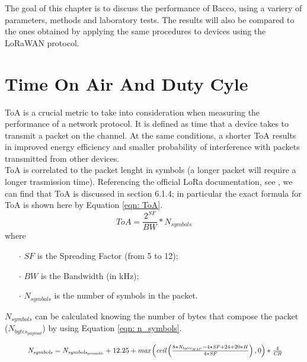 The goal of this chapter is to discuss the performance of Bacco, using a variery of parameters, methods and laboratory
tests. The results will also be compared to the ones obtained by applying the same procedures to devices using the
LoRaWAN protocol.

\section{Time On Air And Duty Cyle}
\Gls{ToA} is a crucial metric to take into consideration when measuring the performance of a network protocol. It is
defined as time that a device takes to transmit a packet on the channel. At the same conditions, a shorter \gls{ToA}
results in improved energy efficiency and smaller probability of interference with packets transmitted from other
devices.\\
\Gls{ToA} is correlated to the packet lenght in symbols (a longer packet will require a longer trasmission time).
Referencing the official LoRa documentation, see \cite{sx1262}, we can find that \gls{ToA} is
discussed in section 6.1.4; in particular the exact formula for \gls{ToA} is shown here by Equation \ref{eqn: ToA}.
\begin{equation}
    \label{eqn: ToA}
    \mathit{ToA} = \frac{2^{\mathit{SF}}}{\mathit{BW}}*\mathit{N_{symbols}}
\end{equation}
where
\begin{itemize}[noitemsep,nolistsep]
    \item[\boldmath$\cdot$] $\mathit{SF}$ is the Spreading Factor (from 5 to 12);
    \item[\boldmath$\cdot$] $\mathit{BW}$ is the Bandwidth (in kHz);
    \item[\boldmath$\cdot$] $\mathit{N_{symbols}}$ is the number of symbols in the packet.
\end{itemize}
\vspace{0.55cm}
$\mathit{N_{symbols}}$ can be calculated knowing the number of bytes that compose the packet ($\mathit{N_{bytes_{payload}}}
$) by using Equation \ref{eqn: n_symbols}.

\begin{equation}
    \label{eqn: n_symbols}
    \resizebox{.9\hsize}{!}{
        \ensuremath{
            \mathit{N_{symbols}} = \mathit{N_{symbols_{preamble}}} + 12.25 + \textit{max} \left( \textit{ceil} \left(
                    \frac{8 * \mathit{N_{bytes_{MAC}}} - 4 * \mathit{SF} + 24 + 20 * H}{4 * \mathit{SF}} \right), 0 \right) * \frac{4}{\mathit{CR}}}}
\end{equation}

